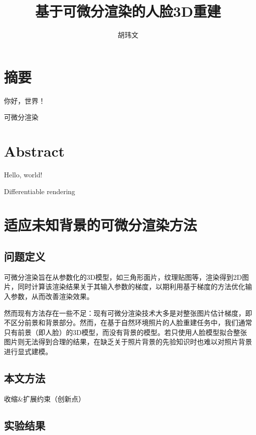 \documentclass{scutmaster}
\title{基于可微分渲染的人脸3D重建}
\author{胡玮文}
\begin{document}
\maketitle
\maketitleEN
\nominationpage
\declareoforiginality

\frontmatter
\chapter{摘要}

你好，世界！

 可微分渲染

\chapter{Abstract}

Hello, world!

 Differentiable rendering

\tableofcontents

\listoffigures

\mainmatter




\chapter{适应未知背景的可微分渲染方法}
\label{chap:method}

\section{问题定义}

可微分渲染旨在从参数化的3D模型，如三角形面片，纹理贴图等，渲染得到2D图片，同时计算该渲染结果关于其输入参数的梯度，以期利用基于梯度的方法优化输入参数，从而改善渲染效果。

然而现有方法存在一些不足：现有可微分渲染技术大多是对整张图片估计梯度，即不区分前景和背景部分。然而，在基于自然环境照片的人脸重建任务中，我们通常只有前景（即人脸）的3D模型，而没有背景的模型。若只使用人脸模型拟合整张图片则无法得到合理的结果，在缺乏关于照片背景的先验知识时也难以对照片背景进行显式建模。

\section{本文方法}

收缩\&扩展约束（创新点）

\section{实验结果}
\end{document}
